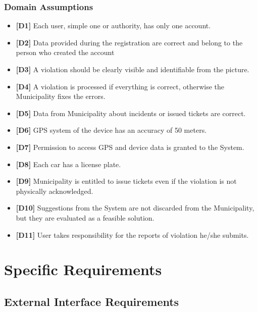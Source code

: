 \documentclass {article}
\begin{document}
		\subsubsection{Domain Assumptions}
		\begin{itemize}
		 \item {\bf [D1]} Each user, simple one or authority, has only one account.
		 \item {\bf [D2]} Data provided during the registration are correct and belong to the person who created the account
		 \item {\bf [D3]} A violation should be clearly visible and identifiable from the picture.
		 \item {\bf [D4]} A violation is processed if everything is correct, otherwise the Municipality fixes the errors.
		 \item {\bf [D5]} Data from Municipality about incidents or issued tickets are correct.
		 \item {\bf [D6]} GPS system of the device has an accuracy of 50 meters.
		 \item {\bf [D7]} Permission to access GPS and device data is granted to the System.
		 \item {\bf [D8]} Each car has a license plate.
		 \item {\bf [D9]} Municipality is entitled to issue tickets even if the violation is not physically acknowledged.
		 \item {\bf [D10]} Suggestions from the System are not discarded from the Municipality, but they are evaluated as a feasible solution.
		 \item {\bf [D11]} User takes responsibility for the reports of violation he/she submits. 
		 \end{itemize}
		
\pagebreak

\section{Specific Requirements}
	\subsection{External Interface Requirements}	
\end{document}
